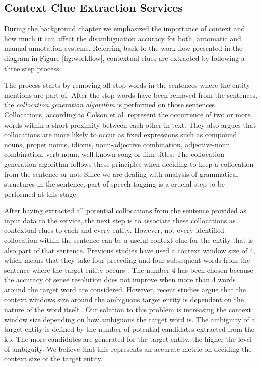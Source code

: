 \subsection{Context Clue Extraction Services}
During the background chapter we emphasized the importance of context and how much it can affect the disambiguation accuracy for both, automatic and manual annotation systems. Referring back to the work-flow presented in the diagram in Figure \ref{fig:workflow}, contextual clues are extracted by following a three step process.

The process starts by removing all stop words in the sentences where the entity mentions are part of. After the stop words have been removed from the sentences, the \textit{collocation generation algorithm} is performed on those sentences. Collocations, according to Colson et al. \cite{52} represent the occurrence of two or more words within a short proximity between each other in text. They also argues that collocations are more likely to occur as fixed expressions such as compound nouns, proper nouns, idioms, noun-adjective combination, adjective-noun combination, verb-noun, well known song or film titles. The collocation generation algorithm follows these principles when deciding to keep a collocation from the sentence or not. Since we are dealing with analysis of grammatical structures in the sentence, part-of-speech tagging is a crucial step to be performed at this stage. 

After having extracted all potential collocations from the sentence provided as input data to the service, the next step is to associate these collocations as contextual clues to each and every entity. However, not every identified collocation within the sentence can be a useful context clue for the entity that is also part of that sentence. Previous studies have used a context window size of 4, which means that they take four preceding and four subsequent words from the sentence where the target entity occurs \cite{35}. The number 4 has been chosen because the accuracy of sense resolution does not improve when more than 4 words around the target word are considered. However, recent studies argue that the context windows size around the ambiguous target entity is dependent on the nature of the word itself \cite{35}. Our solution to this problem is increasing the context window size depending on how ambiguous the target word is. The ambiguity of a target entity is defined by the number of potential candidates extracted from the \ac{kb}. The more candidates are generated for the target entity, the higher the level of ambiguity. We believe that this represents an accurate metric on deciding the context size of the target entity. 

